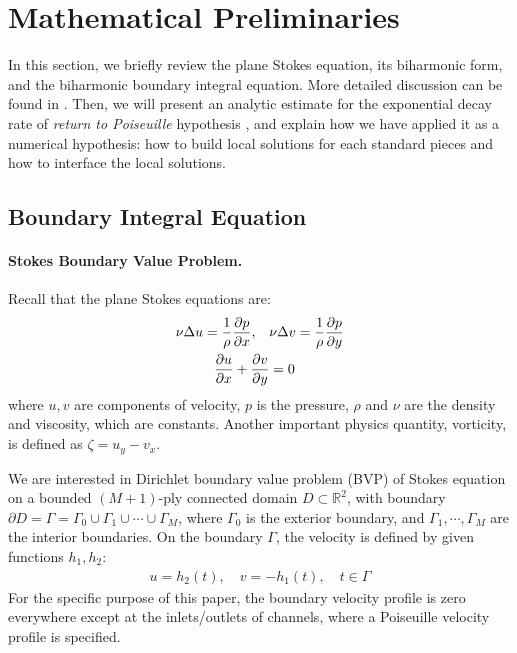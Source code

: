 \documentclass[10pt,twocolumn]{article}
\begin{document}
\section{Mathematical Preliminaries\label{mathprelim}}

In this section, we briefly review the plane Stokes equation, its biharmonic form,
and the biharmonic boundary integral equation. More detailed discussion can be found in 
\cite{greengardIntegralEquationMethods1996}. 
Then, we will present an analytic estimate for the exponential decay rate of 
\textit{return to Poiseuille} hypothesis \cite{gregoryTractionBoundaryValue1980}, 
and explain how we have applied it as a numerical hypothesis: 
how to build local solutions for each standard pieces
and how to interface the local solutions. 

\subsection{Boundary Integral Equation}

\paragraph{Stokes Boundary Value Problem.}

Recall that the plane Stokes equations are:
\begin{align}
  \nu \Delta u = \frac 1 \rho \pdv{p}{x},\quad &\nu \Delta v = \frac 1\rho \pdv{p}{y} 
  \label{stokes} \\
  \pdv{u}{x} + \pdv{v}{y} &= 0
  \label{continuity}
\end{align}
where $u,v$ are components of velocity, $p$ is the pressure, 
$\rho$ and $\nu$ are the density and viscosity, which are constants.  
Another important physics quantity, vorticity, is defined as $\zeta  = u_y - v_x$. 

We are interested in Dirichlet boundary value problem (BVP) of Stokes equation on 
a bounded $(M+1)$-ply connected domain $D\subset \mathbb R^2$,
with boundary $\partial D =  \Gamma = \Gamma_0 \cup \Gamma_1 \cup \cdots \cup \Gamma_M$, 
where $\Gamma_0$ is the exterior boundary, and $\Gamma_1,\cdots, \Gamma_M$ are the interior boundaries. 
On the boundary $\Gamma$, the velocity is defined by given functions $h_1,h_2$:
\begin{align}
  u = h_2(t),\quad v = - h_1(t), \quad t\in \Gamma
  \label{bdr-velocity}
\end{align}
For the specific purpose of this paper, 
the boundary velocity profile is zero everywhere except at the inlets/outlets
of channels, where a Poiseuille velocity profile is specified. 
\end{document}

